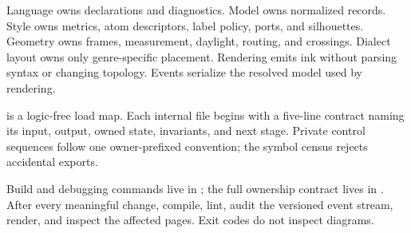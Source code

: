 Language owns declarations and diagnostics.  Model owns normalized records.
Style owns metrics, atom descriptors, label policy, ports, and silhouettes.
Geometry owns frames, measurement, daylight, routing, and crossings.  Dialect
layout owns only genre-specific placement.  Rendering emits ink without
parsing syntax or changing topology.  Events serialize the resolved model
used by rendering.

 is a logic-free load map.  Each internal file begins with a
five-line contract naming its input, output, owned state, invariants, and next
stage.  Private control sequences follow one owner-prefixed convention; the
symbol census rejects accidental exports.

Build and debugging commands live in ; the full ownership
contract lives in .  After every meaningful change,
compile, lint, audit the versioned event stream, render, and inspect the
affected pages.  Exit codes do not inspect diagrams.
